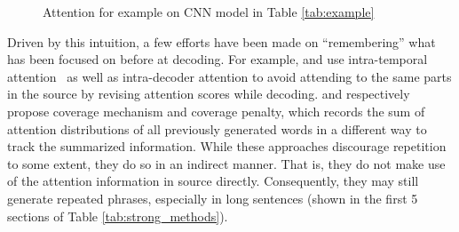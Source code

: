 \documentclass{nle}
\theoremstyle{definition}
\newcommand{\tabref}[1]{Table \ref{#1}}
\begin{document}
\begin{figure}[th!]
	\centering
	\quad
	\quad
	\caption{Attention for example on CNN model in \tabref{tab:example}}
	\label{fig:attn_map}
\end{figure}

Driven by this intuition, a few efforts have been made on ``remembering''
what has been focused on before at decoding. 
For example, 
\cite{PaulusXS17} and 
\cite{FanGA18} use intra-temporal 
attention~\citep{NallapatiZSGX16} as well as intra-decoder attention to avoid
attending to the same parts in the source by 
revising attention scores while decoding. 
\cite{SeeLM17} and \cite{GehrmannDR18}
respectively propose coverage mechanism and coverage penalty,
which records the sum of attention distributions of all previously generated words 
in a different way to track the summarized information.  
While these approaches discourage repetition to some extent,
they do so in an indirect manner. That is, they do not 
make use of the attention information in source directly.
Consequently, they may still generate repeated phrases, 
especially in long sentences (shown in the first 5 sections of
\tabref{tab:strong_methods}).
\end{document}
